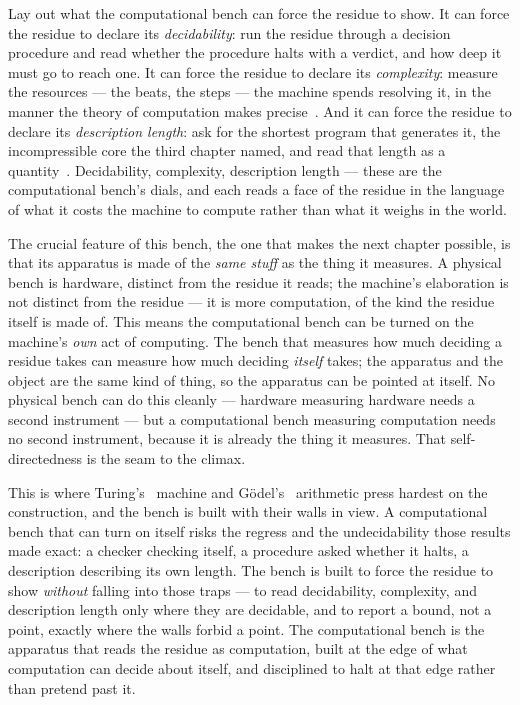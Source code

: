 Lay out what the computational bench can force the residue to show. It can force the residue to declare its
\emph{decidability}: run the residue through a decision procedure and read whether the procedure halts with a verdict,
and how deep it must go to reach one. It can force the residue to declare its \emph{complexity}: measure the resources ---
the beats, the steps --- the machine spends resolving it, in the manner the theory of computation makes precise~\cite{sipser1997, cook1974}. And it can force the residue to declare its \emph{description length}: ask for the shortest program
that generates it, the incompressible core the third chapter named, and read that length as a quantity~\cite{chaitin1974}.
Decidability, complexity, description length --- these are the computational bench's dials, and each reads a face of the
residue in the language of what it costs the machine to compute rather than what it weighs in the world.

The crucial feature of this bench, the one that makes the next chapter possible, is that its apparatus is made of the
\emph{same stuff} as the thing it measures. A physical bench is hardware, distinct from the residue it reads; the
machine's elaboration is not distinct from the residue --- it is more computation, of the kind the residue itself is made
of. This means the computational bench can be turned on the machine's \emph{own} act of computing. The bench that
measures how much deciding a residue takes can measure how much deciding \emph{itself} takes; the apparatus and the
object are the same kind of thing, so the apparatus can be pointed at itself. No physical bench can do this cleanly ---
hardware measuring hardware needs a second instrument --- but a computational bench measuring computation needs no second
instrument, because it is already the thing it measures. That self-directedness is the seam to the climax.

This is where Turing's~\cite{turing1936} machine and G\"odel's~\cite{godel1931} arithmetic press hardest on the
construction, and the bench is built with their walls in view. A computational bench that can turn on itself risks the
regress and the undecidability those results made exact: a checker checking itself, a procedure asked whether it halts,
a description describing its own length. The bench is built to force the residue to show \emph{without} falling into
those traps --- to read decidability, complexity, and description length only where they are decidable, and to report a
bound, not a point, exactly where the walls forbid a point. The computational bench is the apparatus that reads the
residue as computation, built at the edge of what computation can decide about itself, and disciplined to halt at that
edge rather than pretend past it.

